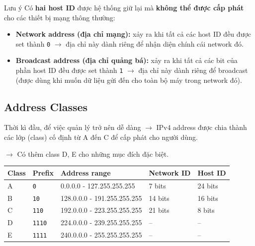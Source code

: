 \begin{mybox}{Lưu ý}
\noindent
Có \textbf{hai host ID} được hệ thống giữ lại mà \textbf{không thể được cấp phát} cho các thiết bị mạng thông thường:

\begin{itemize}
    \item \textbf{Network address (địa chỉ mạng):} xảy ra khi tất cả các host ID đều được set thành \texttt{0} $\rightarrow$ địa chỉ này dành riêng để nhận diện chính cái network đó.
    \item \textbf{Broadcast address (địa chỉ quảng bá):} xảy ra khi tất cả các bit của phần host ID đều được set thành \texttt{1} $\rightarrow$ địa chỉ này dành riêng để broadcast (được dùng khi muốn dữ liệu gửi đến cho toàn bộ máy trong network đó).
\end{itemize}
\end{mybox}
\medskip

\subsection{Address Classes}

\noindent
Thời kì đầu, để việc quản lý trở nên dễ dàng $\rightarrow$ IPv4 address được chia thành các lớp (class) cố định từ A đến C để cấp phát cho người dùng.

$\rightarrow$ Có thêm class D, E cho những mục đích đặc biệt.

\begin{table}[h]
    \renewcommand{\arraystretch}{1.2}
    \begin{tabular*}{\linewidth}{@{\extracolsep{\fill}}lllll}
        \hline
        \textbf{Class} & \textbf{Prefix} & \textbf{Address range} & \textbf{Network ID} & \textbf{Host ID} \\
        \hline
        A & \texttt{0} & 0.0.0.0 - 127.255.255.255 & 7 bits & 24 bits \\
        B & \texttt{10} & 128.0.0.0 - 191.255.255.255 & 14 bits & 16 bits \\
        C & \texttt{110} & 192.0.0.0 - 223.255.255.255 & 21 bits & 8 bits \\
        D & \texttt{1110} & 224.0.0.0 - 239.255.255.255 & -- & -- \\
        E & \texttt{1111} & 240.0.0.0 - 255.255.255.255 & -- & -- \\
        \hline
    \end{tabular*}
\end{table}
\medskip

